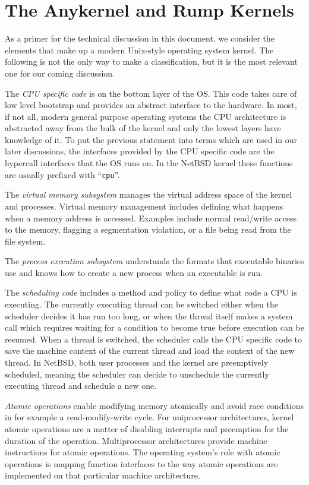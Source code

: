 
\section{The Anykernel and Rump Kernels}
\label{chap:concept}

As a primer for the technical discussion in this document, we
consider the elements that make up a modern Unix-style operating system
kernel.  The following is not the only way to make a classification,
but it is the most relevant one for our coming discussion.

The \textit{CPU specific code} is on the bottom layer of the
OS.  This code takes care of low level bootstrap and provides an
abstract interface to the hardware.  In most, if not all, modern
general purpose operating systems the CPU architecture is abstracted away
from the bulk of the kernel and only the lowest layers have knowledge
of it.  To put the previous statement into terms which are used in our
later discussions, the interfaces provided by the CPU specific code are
the hypercall interfaces that the OS runs on.  In the NetBSD
kernel these functions are usually prefixed with ``\texttt{cpu}''.

The \textit{virtual memory subsystem} manages the virtual address space of
the kernel and processes.  Virtual memory management includes defining what
happens when a memory address is accessed.  Examples include
normal read/write access to the memory, flagging a segmentation violation,
or a file being read from the file system.

The \textit{process execution subsystem} understands the formats that
executable binaries use and knows how to create a new process when an
executable is run.

The \textit{scheduling code} includes a method and policy to define what
code a CPU is executing.  The currently executing thread can be switched
either when the scheduler decides it has run too long, or when the thread
itself makes a system call which requires waiting for a condition to
become true before execution can be resumed.  When a thread is switched,
the scheduler calls the CPU specific code to save the machine context of
the current thread and load the context of the new thread.  In NetBSD,
both user processes and the kernel are preemptively scheduled, meaning
the scheduler can decide to unschedule the currently executing thread
and schedule a new one.

\textit{Atomic operations} enable modifying memory atomically and
avoid race conditions in for example a read-modify-write cycle.
For uniprocessor architectures, kernel atomic operations are a matter of
disabling interrupts and preemption for the duration of the operation.
Multiprocessor architectures provide machine instructions for atomic
operations.  The operating system's role with atomic operations is mapping
function interfaces to the way atomic operations are implemented on that
particular machine architecture.

